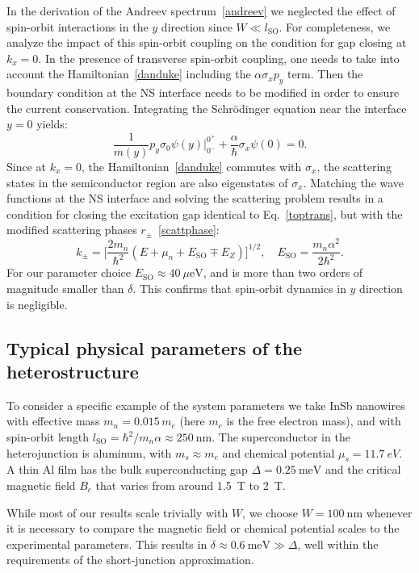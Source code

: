\documentclass[twocolumn, notitlepage, 10pt, aps, floatfix, showpacs, prb, citeautoscript]{revtex4-1}
\begin{document}
In the derivation of the Andreev spectrum~\eqref{andreev} we neglected the effect of spin-orbit interactions in the $y$ direction since $W \ll l_\mathrm{SO}$.
For completeness, we analyze the impact of this spin-orbit coupling on the condition for gap closing at $k_x=0$.
In the presence of transverse spin-orbit coupling, one needs to take into account the Hamiltonian~\eqref{danduke} including the $\alpha\sigma_xp_y$ term.
Then the boundary condition at the NS interface needs to be modified in order to ensure the current conservation.
Integrating the Schr\"odinger equation near the interface $y=0$ yields:
\begin{equation}
\frac{1}{m(y)}p_y\sigma_0\psi(y)\bigg|_{0^-}^{0^+}
+\frac{\alpha}{\hbar}\sigma_x\psi(0)=0.
\end{equation}
Since at $k_x = 0$, the Hamiltonian~\eqref{danduke} commutes with $\sigma_x$, the scattering states in the semiconductor region are also eigenstates of $\sigma_x$.
Matching the wave functions at the NS interface and solving the scattering problem results in a condition for closing the excitation gap identical to Eq.~\eqref{toptrans}, but with the modified scattering phases $r_\pm$~\eqref{scattphase}:
\begin{equation}\label{kx_0}
k_\pm=\bigg[
\frac{2m_n}{\hbar^2}(E+\mu_n+E_\textrm{SO}\mp E_Z)
\bigg]^{1/2},\quad
E_\textrm{SO}=\frac{m_n\alpha^2}{2\hbar^2}.
\end{equation}
For our parameter choice $E_\textrm{SO}\approx\SI{40}{\mu \eV}$, and is more than two orders of magnitude smaller than $\delta$.
This confirms that spin-orbit dynamics in $y$ direction is negligible.

\subsection{Typical physical parameters of the heterostructure}
\label{sec:phys_params}
To consider a specific example of the system parameters we take InSb nanowires~\cite{Mourik2012} with effective mass $m_n=0.015\,m_e$ (here $m_e$ is the free electron mass), and with spin-orbit length $l_\mathrm{SO}=\hbar^2/m_n\alpha\approx \SI{250}{\nm}$.
The superconductor in the heterojunction is aluminum, with $m_s \approx m_e$ and chemical potential $\mu_s=\SI{11.7}{eV}$.
A thin Al film has the bulk superconducting gap $\Delta=\SI{0.25}{\meV}$ and the critical magnetic field $B_c$ that varies from around \SI{1.5}{T} to \SI{2}{T}.

While most of our results scale trivially with $W$, we choose $W=\SI{100}{\nm}$ whenever it is necessary to compare the magnetic field or chemical potential scales to the experimental parameters.
This results in $\delta \approx \SI{0.6}{\meV} \gg \Delta$, well within the requirements of the short-junction approximation.
\end{document}
